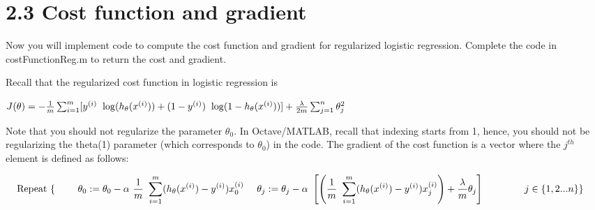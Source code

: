 \documentclass[
]{book}
\begin{document}
\hypertarget{cost-function-and-gradient-1}{%
\section{2.3 Cost function and gradient}\label{cost-function-and-gradient-1}}

Now you will implement code to compute the cost function and gradient for regularized logistic regression. Complete the code in costFunctionReg.m to return the cost and gradient.

Recall that the regularized cost function in logistic regression is

\(J(\theta) = - \frac{1}{m} \sum_{i=1}^m \large[ y^{(i)}\ \log (h_\theta (x^{(i)})) + (1 - y^{(i)})\ \log (1 - h_\theta(x^{(i)}))\large] + \frac{\lambda}{2m}\sum_{j=1}^n \theta_j^2\)

Note that you should not regularize the parameter \(\theta_0\). In Octave/MATLAB, recall that indexing starts from 1, hence, you should not be regularizing the theta(1) parameter (which corresponds to \(\theta_0\)) in the code. The gradient of the cost function is a vector where the \(j^{th}\) element is defined as follows:

\begin{align} & \text{Repeat}\ \lbrace \newline & \ \ \ \ \theta_0 := \theta_0 - \alpha\ \frac{1}{m}\ \sum_{i=1}^m (h_\theta(x^{(i)}) - y^{(i)})x_0^{(i)} \newline & \ \ \ \ \theta_j := \theta_j - \alpha\ \left[ \left( \frac{1}{m}\ \sum_{i=1}^m (h_\theta(x^{(i)}) - y^{(i)})x_j^{(i)} \right) + \frac{\lambda}{m}\theta_j \right] &\ \ \ \ \ \ \ \ \ \ j \in \lbrace 1,2...n\rbrace\newline & \rbrace \end{align}
\end{document}

